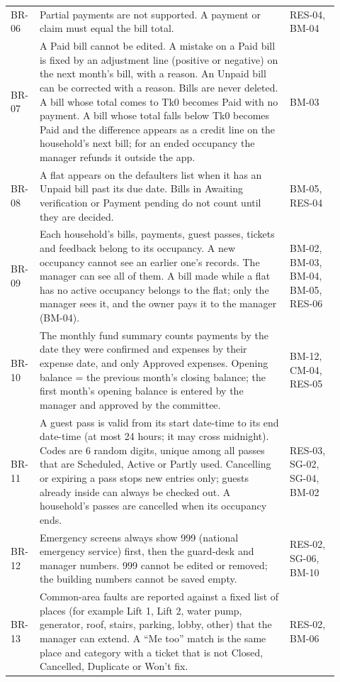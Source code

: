 \documentclass[11pt,a4paper]{report}
\newcommand{\taka}{Tk}
\newcommand{\taka}{{\bnfont\char"09F3}}
\begin{document}
{\begin{longtable}{>{\raggedright\arraybackslash}p{0.067\linewidth}>{\raggedright\arraybackslash}p{0.713\linewidth}>{\raggedright\arraybackslash}p{0.145\linewidth}}
BR-06 & Partial payments are not supported. A payment or claim must equal the bill total. & RES-04, BM-04 \\
BR-07 & A Paid bill cannot be edited. A mistake on a Paid bill is fixed by an adjustment line (positive or negative) on the next month's bill, with a reason. An Unpaid bill can be corrected with a reason. Bills are never deleted. A bill whose total comes to \taka{}0 becomes Paid with no payment. A bill whose total falls below \taka{}0 becomes Paid and the difference appears as a credit line on the household's next bill; for an ended occupancy the manager refunds it outside the app. & BM-03 \\
BR-08 & A flat appears on the defaulters list when it has an Unpaid bill past its due date. Bills in Awaiting verification or Payment pending do not count until they are decided. & BM-05, RES-04 \\
BR-09 & Each household's bills, payments, guest passes, tickets and feedback belong to its occupancy. A new occupancy cannot see an earlier one's records. The manager can see all of them. A bill made while a flat has no active occupancy belongs to the flat; only the manager sees it, and the owner pays it to the manager (BM-04). & BM-02, BM-03, BM-04, BM-05, RES-06 \\
BR-10 & The monthly fund summary counts payments by the date they were confirmed and expenses by their expense date, and only Approved expenses. Opening balance = the previous month's closing balance; the first month's opening balance is entered by the manager and approved by the committee. & BM-12, CM-04, RES-05 \\
BR-11 & A guest pass is valid from its start date-time to its end date-time (at most 24 hours; it may cross midnight). Codes are 6 random digits, unique among all passes that are Scheduled, Active or Partly used. Cancelling or expiring a pass stops new entries only; guests already inside can always be checked out. A household's passes are cancelled when its occupancy ends. & RES-03, SG-02, SG-04, BM-02 \\
BR-12 & Emergency screens always show 999 (national emergency service) first, then the guard-desk and manager numbers. 999 cannot be edited or removed; the building numbers cannot be saved empty. & RES-02, SG-06, BM-10 \\
BR-13 & Common-area faults are reported against a fixed list of places (for example Lift 1, Lift 2, water pump, generator, roof, stairs, parking, lobby, other) that the manager can extend. A ``Me too'' match is the same place and category with a ticket that is not Closed, Cancelled, Duplicate or Won't fix. & RES-02, BM-06 \\

\end{longtable}}
\end{document}
